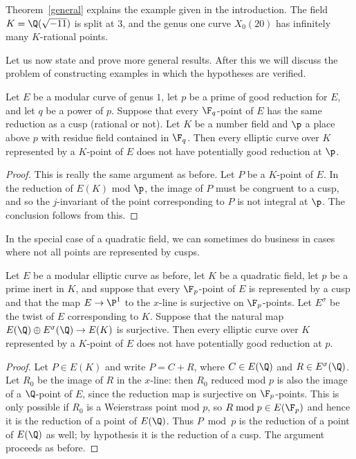 \documentclass[12pt]{amsart}
\begin{document}
Theorem~\ref{general} explains the example given in the introduction.  The field $K=\Q(\sqrt{-11})$ is split at $3$, and the genus one curve $X_0(20)$ has infinitely many $K$-rational points.  

Let us now state and prove more general results.  After this we will discuss
the problem of constructing examples in which the hypotheses are verified.

\begin{thm}\label{thm:weaker}
  Let $E$ be a modular curve of genus $1$, let $p$ be
  a prime of good reduction for $E$, and let $q$ be a power of $p$.
  Suppose that every $\F_q$-point of $E$
  has the same reduction as a cusp (rational or not).  Let $K$ be a number
  field and $\p$ a place above $p$ with residue field contained in $\F_q$.
  Then every elliptic curve over $K$ represented by a $K$-point of $E$ does not
  have potentially good reduction at $\p$.
\end{thm}

\begin{proof} This is really the same argument as before.  Let $P$ be a
  $K$-point of $E$.  In the reduction of $E(K)$ mod $\p$, the image of
  $P$ must be congruent to a cusp, and so the $j$-invariant of the point
  corresponding to $P$ is not integral at $\p$.  The conclusion follows
  from this.
\end{proof}

In the special case of a quadratic field, we can sometimes do business in
cases where not all points are represented by cusps.

\begin{thm}\label{thm:stronger}
  Let $E$ be a modular elliptic curve as before, let $K$ be a quadratic
  field, let $p$ be a prime inert in $K$, and suppose that every $\F_p$-point
  of $E$ is represented by a cusp and that the map $E \to \P^1$ to the
  $x$-line is surjective on $\F_p$-points.  Let $E^\sigma$ be the twist of
  $E$ corresponding to $K$.  Suppose that the natural map
  $E(\Q) \oplus E^\sigma(\Q) \to E(K)$ is surjective.  Then every elliptic
  curve over $K$ represented by a $K$-point of $E$ does not have potentially
  good reduction at $p$.
\end{thm}

\begin{proof} Let $P \in E(K)$ and write $P = C + R$, where $C \in E(\Q)$
  and $R \in E^\sigma(\Q)$.  Let $R_0$ be the
  image of $R$ in the $x$-line: then $R_0$ reduced mod $p$ is also the image of
  a $\Q$-point of $E$, since the reduction map is surjective on $\F_p$-points.
  This is only possible if $R_0$ is a Weierstrass point mod $p$, so 
  $R \bmod p \in E(\F_p)$ and hence it is the reduction of a point of $E(\Q)$.
  Thus $P \bmod p$ is the reduction of a point of $E(\Q)$ as well; by hypothesis
  it is the reduction of a cusp.  The argument proceeds as before.
\end{proof}
\end{document}
